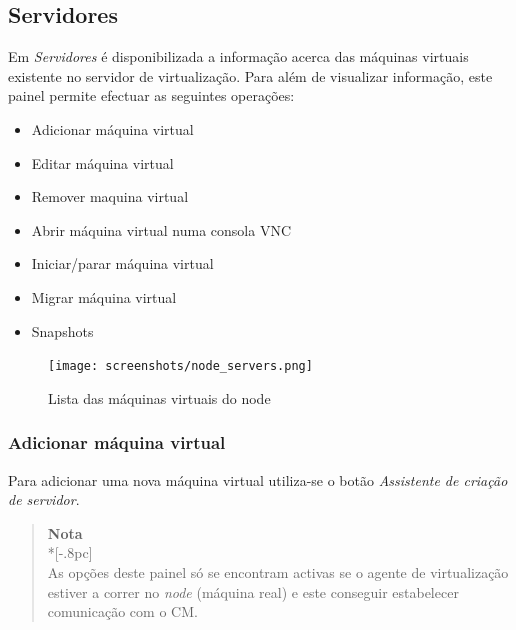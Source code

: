 \subsection{Servidores}
\label{sec:servers}
Em \emph{Servidores} é disponibilizada a informação acerca das máquinas virtuais existente no servidor de virtualização. Para além de visualizar informação, este painel permite efectuar as seguintes operações:
\begin{itemize}
	\item Adicionar máquina virtual
    \item Editar máquina virtual
	\item Remover maquina virtual
	\item Abrir máquina virtual numa consola VNC
	\item Iniciar/parar máquina virtual
    \item Migrar máquina virtual
    \item Snapshots
\end{itemize}
\begin{figure}[H]
	\begin{center}
	\texttt{[image: screenshots/node\_servers.png]}
	\caption{Lista das máquinas virtuais do node}
	\label{fig:node_servers}
	\end{center}
\end{figure}

\subsubsection{Adicionar máquina virtual}
\label{sec:add_server}

Para adicionar uma nova máquina virtual utiliza-se o botão \emph{Assistente de criação de servidor}.
\begin{quote}
	{\large \bf Nota} \\*[-.8pc]
	\underline{\hspace{6in}} \\
	As opções deste painel só se encontram activas se o agente de virtualização estiver a correr no \emph{node} (máquina real) e este conseguir estabelecer comunicação com o CM.
\end{quote}
 

